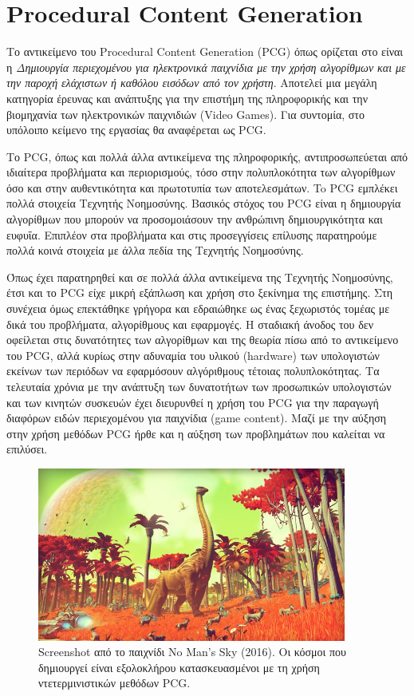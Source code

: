 \thispagestyle{empty}

\chapter{Procedural Content Generation}

Το αντικείμενο του Procedural Content Generation (PCG) όπως ορίζεται στο 
\cite{pcgdef} είναι η \textit{Δημιουργία περιεχομένου για ηλεκτρονικά παιχνίδια με την χρήση αλγορίθμων και με την παροχή ελάχιστων ή καθόλου εισόδων από τον χρήστη}. Αποτελεί μια μεγάλη κατηγορία έρευνας και ανάπτυξης για την επιστήμη της πληροφορικής \cite{futureofcontent} και την βιομηχανία των ηλεκτρονικών παιχνιδιών (Video Games). Για συντομία, στο υπόλοιπο κείμενο της εργασίας θα αναφέρεται ως PCG.
\par
Το PCG, όπως και πολλά άλλα αντικείμενα της πληροφορικής, αντιπροσωπεύεται από ιδιαίτερα προβλήματα και περιορισμούς, τόσο στην πολυπλοκότητα των αλγορίθμων όσο και στην αυθεντικότητα και πρωτοτυπία των αποτελεσμάτων. To PCG εμπλέκει πολλά στοιχεία Τεχνητής Νοημοσύνης. Βασικός στόχος του PCG είναι η δημιουργία αλγορίθμων που μπορούν να προσομοιάσουν την ανθρώπινη δημιουργικότητα και ευφυΐα. Επιπλέον στα προβλήματα και στις προσεγγίσεις επίλυσης παρατηρούμε πολλά κοινά στοιχεία με άλλα πεδία της Τεχνητής Νοημοσύνης.
\par
Όπως έχει παρατηρηθεί και σε πολλά άλλα αντικείμενα της Τεχνητής Νοημοσύνης, έτσι και το PCG είχε μικρή εξάπλωση και χρήση στο ξεκίνημα της επιστήμης. Στη συνέχεια όμως επεκτάθηκε γρήγορα και εδραιώθηκε ως ένας ξεχωριστός τομέας με δικά του προβλήματα, αλγορίθμους και εφαρμογές. Η σταδιακή άνοδος του δεν οφείλεται στις δυνατότητες των αλγορίθμων και της θεωρία πίσω από το αντικείμενο του PCG, αλλά κυρίως στην αδυναμία του υλικού (hardware) των υπολογιστών εκείνων των περιόδων να εφαρμόσουν αλγόριθμους τέτοιας πολυπλοκότητας. Τα τελευταία χρόνια με την ανάπτυξη των δυνατοτήτων των προσωπικών υπολογιστών και των κινητών συσκευών έχει διευρυνθεί η χρήση του PCG για την παραγωγή διαφόρων ειδών περιεχομένου για παιχνίδια (game content). Μαζί με την αύξηση στην χρήση μεθόδων PCG ήρθε και η αύξηση των προβλημάτων που καλείται να επιλύσει.

\begin{figure}[ht]
\centering
\includegraphics[width=4in]{../images/no-mans-sky.jpg}
\caption{Screenshot από το παιχνίδι No Man's Sky (2016). Οι κόσμοι που δημιουργεί είναι εξολοκλήρου κατασκευασμένοι με τη χρήση ντετερμινιστικών μεθόδων PCG.}
\end{figure}

